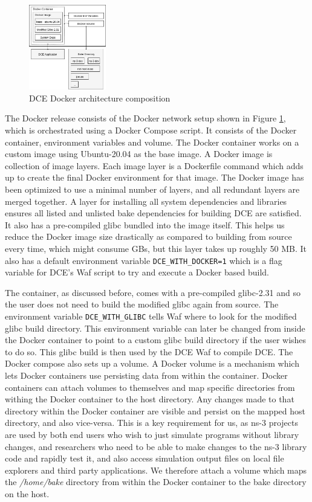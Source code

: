 \documentclass{sig-alternate}
\begin{document}
\begin{figure}[!htb]
  \centering
    \includegraphics[width=0.30\textwidth]{figs/docker-architecture.jpg}

  \caption{DCE Docker architecture composition}
  \label{fig:docker}
\end{figure}


The Docker release consists of the Docker network setup shown in Figure \ref{fig:docker}, which is orchestrated using a Docker Compose script. 
It consists of the Docker container, environment variables and volume. The Docker 
container works on a custom image using Ubuntu-20.04 as the base image. A Docker image is collection of image layers. Each image layer is a 
Dockerfile command which adds up to create the final Docker environment for that image. The Docker image has been optimized to use a minimal number of layers, and 
all redundant layers are merged together. A layer for installing all system dependencies and libraries ensures all listed and unlisted bake 
dependencies for building DCE are satisfied. It also has a pre-compiled glibc bundled into the image itself. This helps us reduce the Docker 
image size drastically as compared to building from source every time, which might consume GBs, but this layer takes up roughly 50 MB.
It also has a default environment variable 
\texttt{DCE\_WITH\_DOCKER=1} which is a flag variable for DCE's Waf script to try and execute a Docker based build.

The container, as discussed before, comes with a pre-compiled glibc-2.31 and so the user does not need to build the modified glibc again from source.
The environment variable \texttt{DCE\_WITH\_GLIBC} tells Waf where to look for the modified glibc build directory.  This environment variable can 
later be changed from inside the Docker container to point to a custom glibc build directory if the user wishes to do so. This glibc build is then 
used by the DCE Waf to compile DCE. The Docker compose also sets up a volume. A Docker volume is a mechanism which lets Docker containers 
use persisting data from within the container. Docker containers can attach volumes to themselves
and map specific directories from withing the Docker container to the host directory. Any changes made to that directory within the Docker container
are visible and persist on the mapped host directory, and also vice-versa. This is a key requirement for us, as ns-3 projects are used by both 
end users who wish to just simulate programs without library changes, and researchers who need to be able to make changes 
to the ns-3 library code and rapidly test it, and also access simulation output files on local file explorers and 
third party applications. We  therefore attach a volume which maps the \emph{/home/bake} directory from within the Docker container to the bake directory on 
the host.
\end{document}
